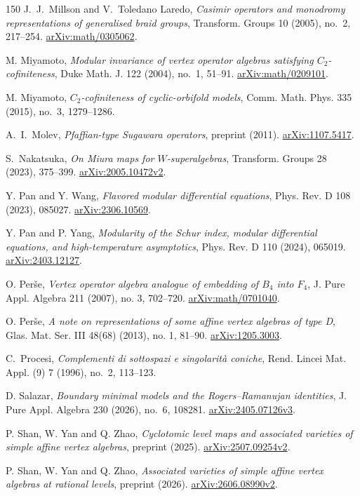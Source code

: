 \documentclass[11pt,a4paper]{amsart}
\numberwithin{equation}{section}
\theoremstyle{definition}
\theoremstyle{remark}
\newcommand{\arxiv}[1]{\href{https://arxiv.org/abs/#1}{arXiv:#1}}
\begin{document}
\begin{thebibliography}{150}
 J.~J.~Millson and V.~Toledano Laredo,
\emph{Casimir operators and monodromy representations of generalised braid groups},
Transform. Groups 10 (2005), no.~2, 217--254. \arxiv{math/0305062}.

 M. Miyamoto,
\emph{Modular invariance of vertex operator algebras satisfying $C_2$-cofiniteness},
Duke Math. J. 122 (2004), no.~1, 51--91. \arxiv{math/0209101}.

 M. Miyamoto,
\emph{$C_2$-cofiniteness of cyclic-orbifold models},
Comm. Math. Phys. 335 (2015), no.~3, 1279--1286. 

 A.~I.~Molev,
\emph{Pfaffian-type Sugawara operators},
preprint (2011). \arxiv{1107.5417}.

 S.~Nakatsuka,
\emph{On Miura maps for $W$-superalgebras},
Transform. Groups 28 (2023), 375--399. \arxiv{2005.10472v2}.

 Y. Pan and Y. Wang,
\emph{Flavored modular differential equations},
Phys. Rev. D 108 (2023), 085027. \arxiv{2306.10569}.

 Y. Pan and P. Yang,
\emph{Modularity of the Schur index, modular differential equations, and high-temperature asymptotics},
Phys. Rev. D 110 (2024), 065019. \arxiv{2403.12127}.

 O. Per\v se,
\emph{Vertex operator algebra analogue of embedding of $B_4$ into $F_4$},
J. Pure Appl. Algebra 211 (2007), no. 3, 702--720. \arxiv{math/0701040}.

 O. Per\v se,
\emph{A note on representations of some affine vertex algebras of type D},
Glas. Mat. Ser. III 48(68) (2013), no. 1, 81--90. \arxiv{1205.3003}.

 C.~Procesi,
\emph{Complementi di sottospazi e singolarit\`a coniche},
Rend. Lincei Mat. Appl. (9) 7 (1996), no.~2, 113--123.

 D. Salazar,
\emph{Boundary minimal models and the Rogers--Ramanujan identities},
J. Pure Appl. Algebra 230 (2026), no.~6, 108281. \arxiv{2405.07126v3}.

 P. Shan, W. Yan and Q. Zhao,
\emph{Cyclotomic level maps and associated varieties of simple affine vertex algebras},
preprint (2025). \arxiv{2507.09254v2}.

 P. Shan, W. Yan and Q. Zhao,
\emph{Associated varieties of simple affine vertex algebras at rational levels},
preprint (2026). \arxiv{2606.08990v2}.


\end{thebibliography}
\end{document}

